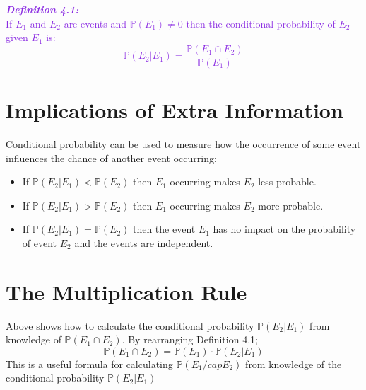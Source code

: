 \documentclass{report}
\newenvironment{cframed}[1][BlueViolet]
  {\begin{tcolorbox}[colframe=#1,colback=white]}
  {\end{tcolorbox}}
\begin{document}
\begin{cframed}
\textcolor{BlueViolet}{\textit{\textbf{Definition 4.1:}}}\\
\textcolor{BlueViolet}{If $E_1$ and $E_2$ are events and $\mathbb{P}(E_1) \neq 0$ then the conditional probability of $E_2$ given $E_1$ is:}
\textcolor{BlueViolet}{\begin{equation}
    \mathbb{P}(E_2|E_1) = \frac{\mathbb{P}(E_1 \cap E_2)}{\mathbb{P}(E_1)}
\end{equation}}
\end{cframed}

\section{Implications of Extra Information}

Conditional probability can be used to measure how the occurrence of some event influences the chance of another event occurring:
\begin{itemize}
    \item If $\mathbb{P}(E_2|E_1) < \mathbb{P}(E_2)$ then $E_1$ occurring makes $E_2$ less probable.

    \item If $\mathbb{P}(E_2|E_1) > \mathbb{P}(E_2)$ then $E_1$ occurring makes $E_2$ more probable.

    \item If $\mathbb{P}(E_2|E_1) = \mathbb{P}(E_2) $ then the event $E_1$ has no impact on the probability of event $E_2$ and the events are independent.
\end{itemize}

\section{The Multiplication Rule}

Above shows how to calculate the conditional probability $\mathbb{P}(E_2|E_1)$ from knowledge of $\mathbb{P}(E_1 \cap E_2)$. By rearranging Definition 4.1;
\begin{equation}
    \mathbb{P}(E_1 \cap E_2) = \mathbb{P}(E_1) \cdot \mathbb{P}(E_2|E_1)
\end{equation}
This is a useful formula for calculating $\mathbb{P}(E_1 /cap E_2)$ from knowledge of the conditional probability $\mathbb{P}(E_2|E_1)$\\
\end{document}
